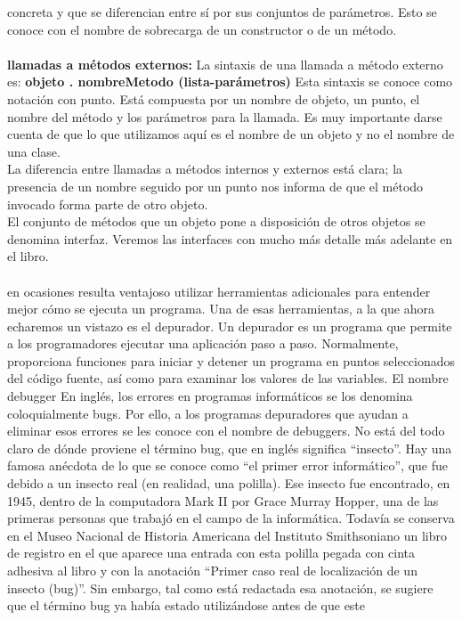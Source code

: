 \documentclass[11pt,a4paper]{article}
\begin{document}
	concreta y que se diferencian entre sí por sus conjuntos de parámetros. Esto se conoce con el nombre
	de sobrecarga de un constructor o de un método.\\
	\\
	\textbf{llamadas a métodos externos:} La sintaxis de una llamada a método externo es:
	\textbf{objeto . nombreMetodo (lista-parámetros) } Esta sintaxis se conoce como notación con punto. Está compuesta por un nombre de objeto, un
	punto, el nombre del método y los parámetros para la llamada. Es muy importante darse cuenta de
	que lo que utilizamos aquí es el nombre de un objeto y no el nombre de una clase.\\
	La diferencia entre llamadas a métodos internos y externos está clara; la presencia de un nombre
	seguido por un punto nos informa de que el método invocado forma parte de otro objeto.\\
	El conjunto de métodos que un objeto pone a disposición de otros objetos se denomina interfaz.
	Veremos las interfaces con mucho más detalle más adelante en el libro.\\
	\\
	en ocasiones resulta ventajoso utilizar herramientas adicionales para entender mejor
	cómo se ejecuta un programa. Una de esas herramientas, a la que ahora echaremos un vistazo es
	el depurador.
	Un depurador es un programa que permite a los programadores ejecutar una aplicación paso a
	paso. Normalmente, proporciona funciones para iniciar y detener un programa en puntos seleccionados
	del código fuente, así como para examinar los valores de las variables. El nombre debugger En inglés, los errores en programas informáticos se los denomina
	coloquialmente bugs. Por ello, a los programas depuradores que ayudan a eliminar esos errores se les
	conoce con el nombre de debuggers.
	No está del todo claro de dónde proviene el término bug, que en inglés significa “insecto”. Hay una
	famosa anécdota de lo que se conoce como “el primer error informático”, que fue debido a un insecto
	real (en realidad, una polilla). Ese insecto fue encontrado, en 1945, dentro de la computadora Mark II
	por Grace Murray Hopper, una de las primeras personas que trabajó en el campo de la informática.
	Todavía se conserva en el Museo Nacional de Historia Americana del Instituto Smithsoniano un libro
	de registro en el que aparece una entrada con esta polilla pegada con cinta adhesiva al libro y con
	la anotación “Primer caso real de localización de un insecto (bug)”. Sin embargo, tal como está
	redactada esa anotación, se sugiere que el término bug ya había estado utilizándose antes de que este
\end{document}
